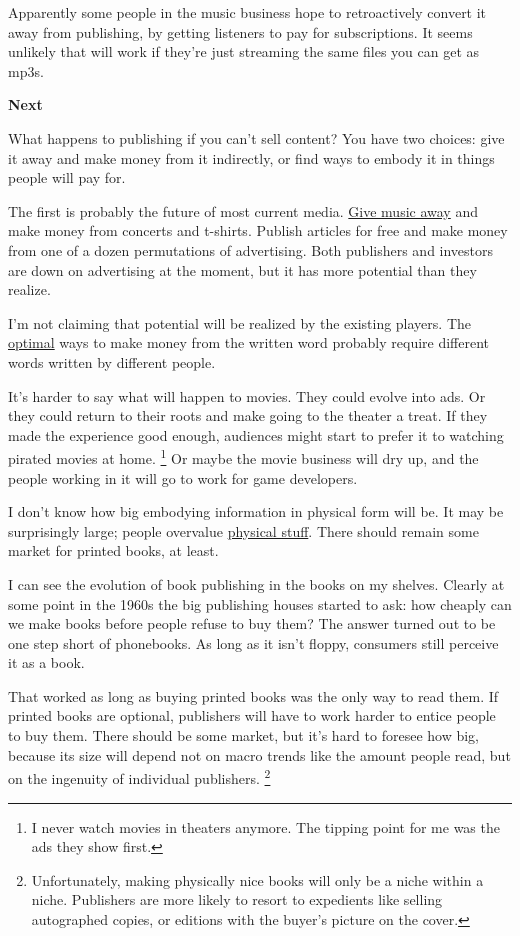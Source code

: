 \documentclass[12pt]{book}
\begin{document}
Apparently some people in the music business hope to retroactively
convert it away from publishing, by getting listeners to pay for
subscriptions. It seems unlikely that will work if they're just
streaming the same files you can get as mp3s.

\textbf{Next}

What happens to publishing if you can't sell content? You have two
choices: give it away and make money from it indirectly, or find ways to
embody it in things people will pay for.

The first is probably the future of most current media.
\href{http://thesixtyone.com}{Give music away} and make money from
concerts and t-shirts. Publish articles for free and make money from one
of a dozen permutations of advertising. Both publishers and investors
are down on advertising at the moment, but it has more potential than
they realize.

I'm not claiming that potential will be realized by the existing
players. The \href{http://ycombinator.com/rfs1.html}{optimal} ways to
make money from the written word probably require different words
written by different people.

It's harder to say what will happen to movies. They could evolve into
ads. Or they could return to their roots and make going to the theater a
treat. If they made the experience good enough, audiences might start to
prefer it to watching pirated movies at home. \footnote{I never watch movies in theaters anymore. The tipping point for
me was the ads they show first.} Or
maybe the movie business will dry up, and the people working in it will
go to work for game developers.

I don't know how big embodying information in physical form will be. It
may be surprisingly large; people overvalue \href{stuff.html}{physical
stuff}. There should remain some market for printed books, at least.

I can see the evolution of book publishing in the books on my shelves.
Clearly at some point in the 1960s the big publishing houses started to
ask: how cheaply can we make books before people refuse to buy them? The
answer turned out to be one step short of phonebooks. As long as it
isn't floppy, consumers still perceive it as a book.

That worked as long as buying printed books was the only way to read
them. If printed books are optional, publishers will have to work harder
to entice people to buy them. There should be some market, but it's hard
to foresee how big, because its size will depend not on macro trends
like the amount people read, but on the ingenuity of individual
publishers. \footnote{Unfortunately, making physically nice books will only be a niche
within a niche. Publishers are more likely to resort to expedients like
selling autographed copies, or editions with the buyer's picture on the
cover.}
\end{document}
